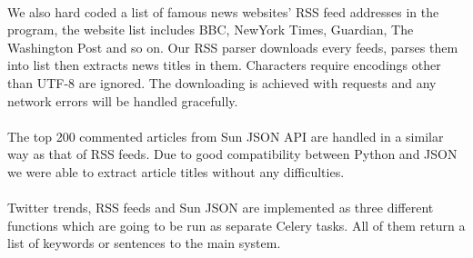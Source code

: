 \paragraph{}
We also hard coded a list of famous news websites' RSS feed addresses in the 
program, the website list includes BBC, NewYork Times, Guardian, The Washington 
Post and so on. Our RSS parser downloads every feeds, parses them into list 
then extracts news titles in them. Characters require encodings other than 
UTF-8 are ignored. The downloading is achieved with requests and any network 
errors will be handled gracefully. 
\paragraph{}
The top 200 commented articles from Sun JSON API are handled in a similar way 
as that of RSS feeds. Due to good compatibility between Python and JSON we 
were able to extract article titles without any difficulties. 
\paragraph{}
Twitter trends, RSS feeds and Sun JSON are implemented as three different 
functions which are going to be run as separate Celery tasks. All of them 
return a list of keywords or sentences to the main system. 
